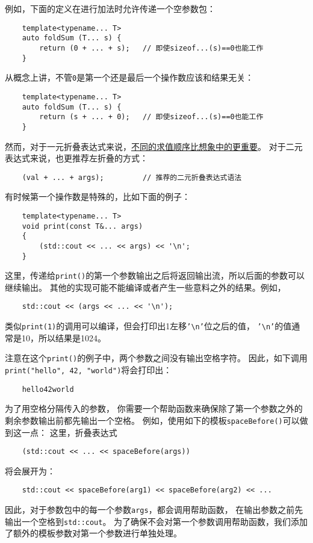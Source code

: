 例如，下面的定义在进行加法时允许传递一个空参数包：
\begin{lstlisting}
    template<typename... T>
    auto foldSum (T... s) {
        return (0 + ... + s);   // 即使sizeof...(s)==0也能工作
    }
\end{lstlisting}
从概念上讲，不管\texttt{0}是第一个还是最后一个操作数应该和结果无关：
\begin{lstlisting}
    template<typename... T>
    auto foldSum (T... s) {
        return (s + ... + 0);   // 即使sizeof...(s)==0也能工作
    }
\end{lstlisting}
然而，对于一元折叠表达式来说，\hyperref[ch11.2]{不同的求值顺序比想象中的更重要}。
对于二元表达式来说，也更推荐左折叠的方式：
\begin{lstlisting}
    (val + ... + args);         // 推荐的二元折叠表达式语法
\end{lstlisting}
有时候第一个操作数是特殊的，比如下面的例子：
\begin{lstlisting}
    template<typename... T>
    void print(const T&... args)
    {
        (std::cout << ... << args) << '\n';
    }
\end{lstlisting}
这里，传递给\texttt{print()}的第一个参数输出之后将返回输出流，所以后面的参数可以继续输出。
其他的实现可能不能编译或者产生一些意料之外的结果。例如，
\begin{lstlisting}
    std::cout << (args << ... << '\n');
\end{lstlisting}
类似\texttt{print(1)}的调用可以编译，但会打印出1左移\texttt{'\textbackslash n'}位之后的值，
\texttt{'\textbackslash n'}的值通常是10，所以结果是1024。

注意在这个\texttt{print()}的例子中，两个参数之间没有输出空格字符。
因此，如下调用\texttt{print("hello", 42, "world")}将会打印出：
\begin{lstlisting}
    hello42world
\end{lstlisting}
为了用空格分隔传入的参数，
你需要一个帮助函数来确保除了第一个参数之外的剩余参数输出前都先输出一个空格。
例如，使用如下的模板\texttt{spaceBefore()}可以做到这一点：
这里，折叠表达式
\begin{lstlisting}
    (std::cout << ... << spaceBefore(args))
\end{lstlisting}
将会展开为：
\begin{lstlisting}
    std::cout << spaceBefore(arg1) << spaceBefore(arg2) << ...
\end{lstlisting}
因此，对于参数包中的每一个参数\texttt{args}，都会调用帮助函数，
在输出参数之前先输出一个空格到\texttt{std::cout}。
为了确保不会对第一个参数调用帮助函数，我们添加了额外的模板参数对第一个参数进行单独处理。

